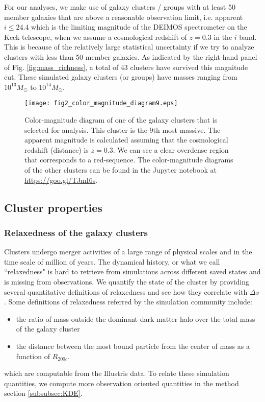 For our analyses, we make use of galaxy clusters / groups 
with at least 50 member galaxies that are above a reasonable observation limit, 
i.e. apparent $i \leq 24.4$ which is the limiting magnitude of the DEIMOS
spectrometer on the Keck telescope, when we assume a cosmological redshift of $z = 0.3$
in the $i$ band. 
This is because of the relatively large statistical uncertainty if we try
to analyze clusters with less than 50 member galaxies. 
As indicated by the right-hand panel of Fig. \ref{fig:mass_richness}, a total of 43 clusters have 
survived this magnitude cut. These simulated galaxy clusters (or groups) have 
masses ranging from $10^{13} M_\odot $ to $10^{14} M_\odot$.  

\begin{figure}
	\centering
	\texttt{[image: fig2\_color\_magnitude\_diagram9.eps]}
	\caption{Color-magnitude diagram of one of the galaxy clusters that is selected for 
		analysis. This cluster is the 9th most massive. 
		The apparent magnitude is calculated assuming that 
		the cosmological redshift (distance) is $z = 0.3$. 
		We can see a clear overdense region that corresponds to a red-sequence.
		The color-magnitude diagrams of the other clusters can be found in the
		Jupyter notebook at \href{https://github.com/karenyyng/galaxy_DM_offset/blob/master/code/analyses/fig2_color_magnitude_diagram.ipynb}{https://goo.gl/TJmI6s}.
		\label{fig:color_magnitude_diagram}
	} 
\end{figure}




\subsection{Cluster properties}
\label{subsubsec:cluster_properties}

\subsubsection{Relaxedness of the galaxy clusters}

Clusters undergo merger activities of a large range of physical scales and 
in the time scale of million of years. 
The dynamical history, or what we call ``relaxedness" is hard to retrieve from 
simulations across different saved states and is missing from observations.
We quantify the state of the cluster by providing several quantitative
definitions of relaxedness and see how they correlate with $\Delta s$.
Some definitions of relaxedness referred by the simulation community
include:
\begin{itemize}
	\item the ratio of mass outside the dominant dark matter halo over the total mass
		of the galaxy cluster 
	\item the distance between the most bound particle from the center of mass as a
		function of $R_{200c}$.
\end{itemize}
which are computable from the Illustris data. 
To relate these simulation quantities, we compute more observation oriented 
quantities in the method section \ref{subsubsec:KDE}. 


